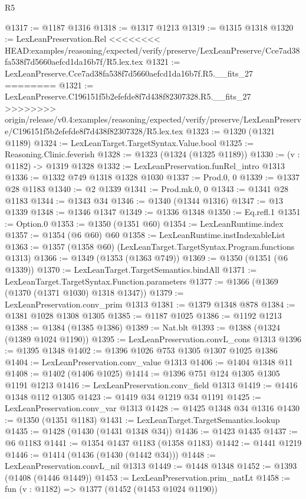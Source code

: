 \begin{lexlean}{R5}
\begin{coremodule}
{{{{{{{{{{{{{{{{{{{{{{{{{{{{{{{{{{{{{{{{{{{{{{{{{{{{{{{{{{{{{{{{{{{{{{{{{{{{{{{{{{{{@1317 := @1187 @1316
@1318 := @1317 @1213
@1319 := @1315 @1318
@1320 := LexLeanPreservation.Rel
<<<<<<<< HEAD:examples/reasoning/expected/verify/preserve/LexLeanPreserve/Cce7ad38fa538f7d5660aefcd1da16b7f/R5.lex.tex
@1321 := LexLeanPreserve.Cce7ad38fa538f7d5660aefcd1da16b7f.R5.__fits_27
========
@1321 := LexLeanPreserve.C196151f5b2efefde8f7d438f82307328.R5.__fits_27
>>>>>>>> origin/release/v0.4:examples/reasoning/expected/verify/preserve/LexLeanPreserve/C196151f5b2efefde8f7d438f82307328/R5.lex.tex
@1323 := @1320 (@1321 @1189)
@1324 := LexLeanTarget.TargetSyntax.Value.bool
@1325 := Reasoning.Clinic.feverish
@1328 := @1323 (@1324 (@1325 @1189))
@1330 := (v : @1182) -> @1319 @1328
@1332 := LexLeanPreservation.funRel_intro @1313
@1336 := @1332 @749 @1318 @1328 @1030
@1337 := Prod.{0, 0}
@1339 := @1337 @28 @1183
@1340 := @2 @1339
@1341 := Prod.mk.{0, 0}
@1343 := @1341 @28 @1183
@1344 := @1343 @34
@1346 := @1340 (@1344 @1316)
@1347 := @13 @1339
@1348 := @1346 @1347
@1349 := @1336 @1348
@1350 := Eq.refl.{1}
@1351 := Option.{0}
@1353 := @1350 (@1351 @60)
@1354 := LexLeanRuntime.index
@1357 := @1354 (@6 @60) @60
@1358 := LexLeanRuntime.instIndexableList
@1363 := @1357 (@1358 @60) (LexLeanTarget.TargetSyntax.Program.functions @1313)
@1366 := @1349 (@1353 (@1363 @749))
@1369 := @1350 (@1351 (@6 @1339))
@1370 := LexLeanTarget.TargetSemantics.bindAll
@1371 := LexLeanTarget.TargetSyntax.Function.parameters
@1377 := @1366 (@1369 (@1370 (@1371 @1030) @1318 @1347))
@1379 := LexLeanPreservation.conv_prim @1313
@1381 := @1379 @1348 @878
@1384 := @1381 @1028 @1308 @1305
@1385 := @1187 @1025
@1386 := @1192 @1213
@1388 := @1384 (@1385 @1386)
@1389 := Nat.blt
@1393 := @1388 (@1324 (@1389 @1024 @1190))
@1395 := LexLeanPreservation.convL_cons @1313
@1396 := @1395 @1348
@1402 := @1396 @1026 @753 @1305 @1307 @1025 @1386
@1404 := LexLeanPreservation.conv_value @1313
@1406 := @1404 @1348 @11
@1408 := @1402 (@1406 @1025)
@1414 := @1396 @751 @124 @1305 @1305 @1191 @1213
@1416 := LexLeanPreservation.conv_field @1313
@1419 := @1416 @1348 @112 @1305
@1423 := @1419 @34 @1219 @34 @1191
@1425 := LexLeanPreservation.conv_var @1313
@1428 := @1425 @1348 @34 @1316
@1430 := @1350 (@1351 @1183)
@1431 := LexLeanTarget.TargetSemantics.lookup
@1435 := @1428 (@1430 (@1431 @1348 @34))
@1436 := @1423 @1435
@1437 := @6 @1183
@1441 := @1354 @1437 @1183 (@1358 @1183)
@1442 := @1441 @1219
@1446 := @1414 (@1436 (@1430 (@1442 @34)))
@1448 := LexLeanPreservation.convL_nil @1313
@1449 := @1448 @1348
@1452 := @1393 (@1408 (@1446 @1449))
@1453 := LexLeanPreservation.prim_natLt
@1458 := fun (v : @1182) => @1377 (@1452 (@1453 @1024 @1190))
}}}}}}}}}}}}}}}}}}}}}}}}}}}}}}}}}}}}}}}}}}}}}}}}}}}}}}}}}}}}}}}}}}}}}}}}}}}}}}}}}}}}
\end{coremodule}
\end{lexlean}
